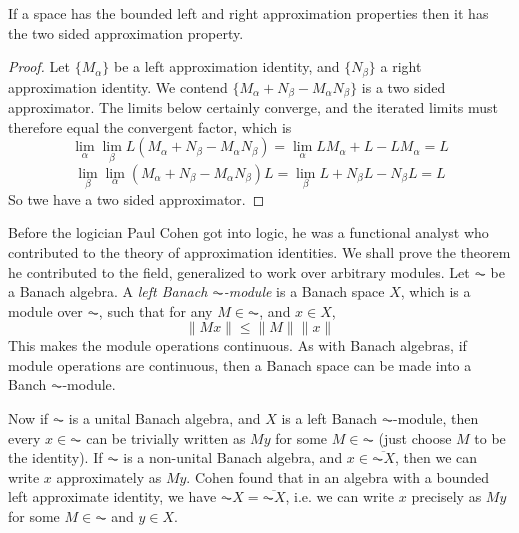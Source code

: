 \begin{lemma}
    If a space has the bounded left and right approximation properties then it has the two sided approximation property.
\end{lemma}
\begin{proof}
    Let $\{ M_\alpha \}$ be a left approximation identity, and $\{ N_\beta \}$ a right approximation identity. We contend $\{ M_\alpha + N_\beta - M_\alpha N_\beta \}$ is a two sided approximator. The limits below certainly converge, and the iterated limits must therefore equal the convergent factor, which is
    \[ \lim_\alpha \lim_\beta L(M_\alpha + N_\beta - M_\alpha N_\beta) = \lim_\alpha LM_\alpha + L - LM_\alpha = L \]
    \[ \lim_\beta \lim_\alpha (M_\alpha + N_\beta - M_\alpha N_\beta)L = \lim_\beta L + N_\beta L - N_\beta L = L \]
    So twe have a two sided approximator.
\end{proof}

Before the logician Paul Cohen got into logic, he was a functional analyst who contributed to the theory of approximation identities. We shall prove the theorem he contributed to the field, generalized to work over arbitrary modules. Let $\AC$ be a Banach algebra. A \emph{left Banach $\AC$-module} is a Banach space $X$, which is a module over $\AC$, such that for any $M \in \AC$, and $x \in X$,
%
\[ \| Mx \| \leq \| M \| \| x \| \]
%
This makes the module operations continuous. As with Banach algebras, if module operations are continuous, then a Banach space can be made into a Banch $\AC$-module.

Now if $\AC$ is a unital Banach algebra, and $X$ is a left Banach $\AC$-module, then every $x \in \AC$ can be trivially written as $My$ for some $M \in \AC$ (just choose $M$ to be the identity). If $\AC$ is a non-unital Banach algebra, and $x \in \overline{\AC X}$, then we can write $x$ approximately as $My$. Cohen found that in an algebra with a bounded left approximate identity, we have $\AC X = \overline{\AC X}$, i.e. we can write $x$ precisely as $My$ for some $M \in \AC$ and $y \in X$.

